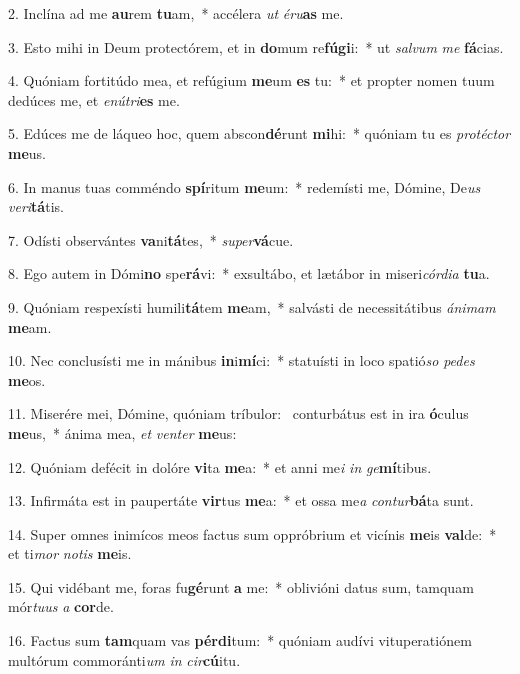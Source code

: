 2. Inclína ad me \textbf{au}rem \textbf{tu}am,~*  accélera \textit{ut} \textit{é}\textit{ru}\textbf{as} me.\

3. Esto mihi in Deum protectórem, et in \textbf{do}mum re\textbf{fú}\textbf{gi}i:~*  ut \textit{sal}\textit{vum} \textit{me} \textbf{fá}cias.\

4. Quóniam fortitúdo mea, et refúgium \textbf{me}um \textbf{es} tu:~*  et propter nomen tuum dedúces me, et \textit{e}\textit{nú}\textit{tri}\textbf{es} me.\

5. Edúces me de láqueo hoc, quem abscon\textbf{dé}runt \textbf{mi}hi:~*  quóniam tu es \textit{pro}\textit{téc}\textit{tor} \textbf{me}us.\

6. In manus tuas comméndo \textbf{spí}ritum \textbf{me}um:~*  redemísti me, Dómine, De\textit{us} \textit{ve}\textit{ri}\textbf{tá}tis.\

7. Odísti observántes \textbf{va}ni\textbf{tá}tes,~*  \textit{su}\textit{per}\textbf{vá}cue.\

8. Ego autem in Dómi\textbf{no} spe\textbf{rá}vi:~*  exsultábo, et lætábor in miseri\textit{cór}\textit{di}\textit{a} \textbf{tu}a.\

9. Quóniam respexísti humili\textbf{tá}tem \textbf{me}am,~*  salvásti de necessitátibus \textit{á}\textit{ni}\textit{mam} \textbf{me}am.\

10. Nec conclusísti me in mánibus \textbf{in}i\textbf{mí}ci:~*  statuísti in loco spatió\textit{so} \textit{pe}\textit{des} \textbf{me}os.\

11. Miserére mei, Dómine, quóniam tríbulor: \dag\  conturbátus est in ira \textbf{ó}culus \textbf{me}us,~*  ánima mea, \textit{et} \textit{ven}\textit{ter} \textbf{me}us:\

12. Quóniam defécit in dolóre \textbf{vi}ta \textbf{me}a:~*  et anni me\textit{i} \textit{in} \textit{ge}\textbf{mí}tibus.\

13. Infirmáta est in paupertáte \textbf{vir}tus \textbf{me}a:~*  et ossa me\textit{a} \textit{con}\textit{tur}\textbf{bá}ta sunt.\

14. Super omnes inimícos meos factus sum oppróbrium et vicínis \textbf{me}is \textbf{val}de:~*  et ti\textit{mor} \textit{no}\textit{tis} \textbf{me}is.\

15. Qui vidébant me, foras fu\textbf{gé}runt \textbf{a} me:~*  oblivióni datus sum, tamquam mór\textit{tu}\textit{us} \textit{a} \textbf{cor}de.\

16. Factus sum \textbf{tam}quam vas \textbf{pér}\textbf{di}tum:~*  quóniam audívi vituperatiónem multórum commoránti\textit{um} \textit{in} \textit{cir}\textbf{cú}itu.\

